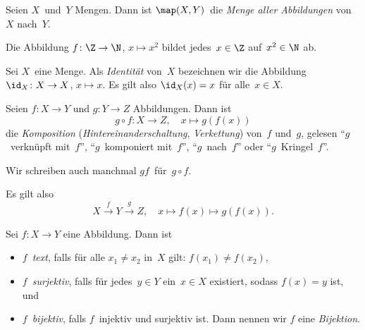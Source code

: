 \documentclass[a4paper]{article}
\begin{document}
\begin{definition}
    Seien $X$~und~$Y$ Mengen. Dann ist $\map(X, Y)$~die \emph{Menge aller Abbildungen} von~$X$ nach~$Y$.
\end{definition}

\begin{example}
    Die Abbildung $f\colon \Z \to \N$, $x \mapsto x^2$ bildet jedes~$x \in \Z$ auf~$x^2 \in \N$ ab.
\end{example}

\begin{definition}[Identität]
    Sei $X$~eine Menge. Als \emph{Identität} von~$X$ bezeichnen wir die Abbildung~$\id_X\colon X \to X$, $x \mapsto x$. Es gilt also $\id_X(x) = x$ für alle~$x \in X$.
\end{definition}

\begin{definition}
    Seien $f\colon X \to Y$ und $g\colon Y \to Z$ Abbildungen. Dann ist
    \begin{equation*}
        g \circ f\colon X \to Z,\quad x \mapsto g(f(x))
    \end{equation*}
    die \emph{Komposition} (\emph{Hintereinanderschaltung}, \emph{Verkettung}) von~$f$ und~$g$, gelesen "`$g$~verknüpft mit~$f$"', "`$g$~komponiert mit~$f$"', "`$g$~nach~$f$"' oder "`$g$~Kringel~$f$"'.
\end{definition}

\begin{notation}
    Wir schreiben auch manchmal $gf$~für~$g \circ f$.
\end{notation}

Es gilt also
\begin{equation*}
    X \overset{f}{\longrightarrow} Y \overset{g}{\longrightarrow} Z,\quad x \mapsto f(x) \mapsto g(f(x)).
\end{equation*}

\begin{definition}
    Sei $f\colon X \to Y$ eine Abbildung. Dann ist
    \begin{itemize}
        \item $f$~\emph{text}, falls für alle $x_1 \neq x_2$ in~$X$ gilt: $f(x_1) \neq f(x_2)$,
        \item $f$~\emph{surjektiv}, falls für jedes~$y \in Y$ ein~$x \in X$ existiert, sodass $f(x) = y$ ist, und
        \item $f$~\emph{bijektiv}, falls $f$~injektiv und surjektiv ist. Dann nennen wir $f$ eine \emph{Bijektion}.
    \end{itemize}
\end{definition}
\end{document}
